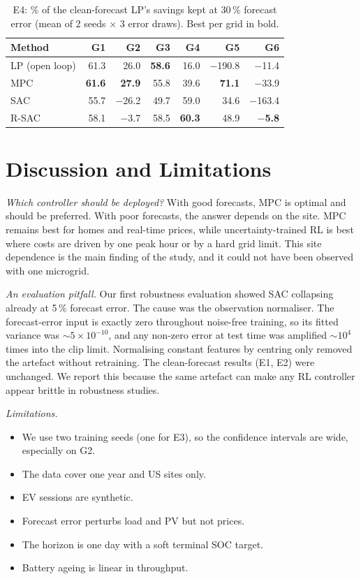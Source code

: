 \documentclass[conference]{IEEEtran}
\newcommand{\G}[1]{\textsf{#1}}
\begin{document}
\begin{table}[t]
\centering
\caption{E4: \% of the clean-forecast LP's savings kept at 30\,\% forecast error
(mean of 2 seeds $\times$ 3 error draws). Best per grid in bold.}
\label{tab:e4}
\setlength{\tabcolsep}{4pt}
\begin{tabular}{lrrrrrr}
\toprule
Method & G1 & G2 & G3 & G4 & G5 & G6 \\
\midrule
LP (open loop) & 61.3 & 26.0 & \textbf{58.6} & 16.0 & $-$190.8 & $-$11.4 \\
MPC & \textbf{61.6} & \textbf{27.9} & 55.8 & 39.6 & \textbf{71.1} & $-$33.9 \\
SAC & 55.7 & $-$26.2 & 49.7 & 59.0 & 34.6 & $-$163.4 \\
R-SAC & 58.1 & $-$3.7 & 58.5 & \textbf{60.3} & 48.9 & \textbf{$-$5.8} \\
\bottomrule
\end{tabular}
\end{table}

\section{Discussion and Limitations}
\label{sec:disc}

\textit{Which controller should be deployed?} With good forecasts, MPC is
optimal and should be preferred. With poor forecasts, the answer depends on the
site. MPC remains best for homes and real-time prices, while
uncertainty-trained RL is best where costs are driven by one peak hour or by a
hard grid limit. This site dependence is the main finding of the study, and it
could not have been observed with one microgrid.

\textit{An evaluation pitfall.} Our first robustness evaluation showed SAC
collapsing already at 5\,\% forecast error. The cause was the observation
normaliser. The forecast-error input is exactly zero throughout noise-free
training, so its fitted variance was ${\sim}5\times10^{-10}$, and any non-zero
error at test time was amplified ${\sim}10^4$ times into the clip limit.
Normalising constant features by centring only removed the artefact without retraining.
The clean-forecast results (E1, E2) were unchanged. We report this because the same
artefact can make any RL controller appear brittle in robustness studies.

\textit{Limitations.}
\begin{itemize}
\item We use two training seeds (one for E3), so the confidence intervals are wide, especially on \G{G2}.
\item The data cover one year and US sites only.
\item EV sessions are synthetic.
\item Forecast error perturbs load and PV but not prices.
\item The horizon is one day with a soft terminal SOC target.
\item Battery ageing is linear in throughput.
\end{itemize}
\end{document}
